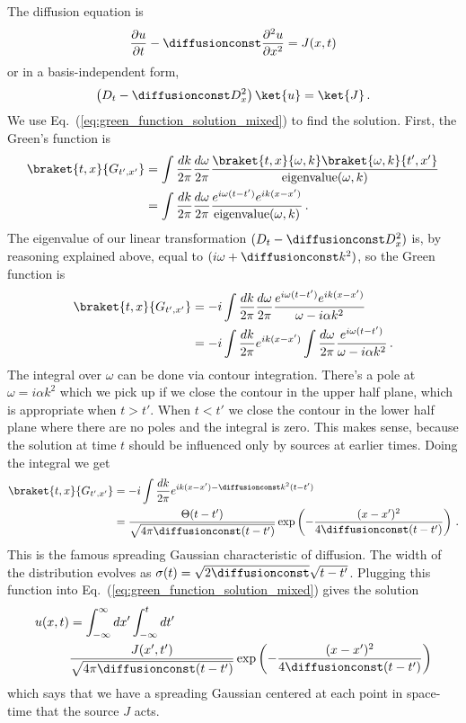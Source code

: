 
The diffusion equation is
\begin{equation}
  \frac{\partial u}{\partial t} - \diffusionconst \frac{\partial^2 u}{\partial x^2} = J(x, t)
\end{equation}
or in a basis-independent form,
\begin{equation}
  \left( D_t - \diffusionconst D_x^2 \right) \ket{u} = \ket{J}
  \, .
\end{equation}
We use Eq.~(\ref{eq:green_function_solution_mixed}) to find the solution.
First, the Green's function is
\begin{align}
  \braket{t, x}{G_{t', x'}}
  &= \int \frac{dk}{2\pi}\frac{d\omega}{2\pi} \frac{\braket{t, x}{\omega, k} \braket{\omega, k}{t', x'}}{\text{eigenvalue}(\omega, k)} \nonumber \\
  &= \int \frac{dk}{2\pi}\frac{d\omega}{2\pi} \frac{e^{i\omega (t-t')} e^{i k(x - x')}}{\text{eigenvalue}(\omega, k)}
  \, .
\end{align}
The eigenvalue of our linear transformation $(D_t - \diffusionconst D_x^2)$ is, by reasoning explained above, equal to $(i \omega + \diffusionconst k^2)$, so the Green function is
\begin{align}
  \braket{t, x}{G_{t', x'}}
  &= -i \int \frac{dk}{2\pi}\frac{d\omega}{2\pi} \frac{e^{i\omega (t-t')} e^{i k(x - x')}}{\omega - i \alpha k^2} \nonumber \\
  &= -i \int \frac{dk}{2\pi} e^{i k(x - x')}
  \int \frac{d\omega}{2\pi} \frac{e^{i\omega (t - t')}}{\omega - i \alpha k^2} \nonumber
  \, .
\end{align}
The integral over $\omega$ can be done via contour integration.
There's a pole at $\omega = i \alpha k^2$ which we pick up if we close the contour in the upper half plane, which is appropriate when $t > t'$.
When $t < t'$ we close the contour in the lower half plane where there are no poles and the integral is zero.
This makes sense, because the solution at time $t$ should be influenced only by sources at earlier times.
Doing the integral we get
\begin{align}
  \braket{t, x}{G_{t', x'}}
  &= -i \int \frac{dk}{2\pi} e^{i k(x - x') - \diffusionconst k^2 (t - t')} \nonumber \\
  &= \frac{\Theta(t-t')}{\sqrt{4 \pi \diffusionconst (t - t')}} \exp \left(
    - \frac{(x - x')^2}{4 \diffusionconst (t - t')}
  \right)
  \, . \nonumber
\end{align}
This is the famous spreading Gaussian characteristic of diffusion.
The width of the distribution evolves as $\sigma(t) = \sqrt{2 \diffusionconst} \sqrt{t - t'}$.
Plugging this function into Eq.~(\ref{eq:green_function_solution_mixed}) gives the solution
\begin{align}
  u(x, t)
  & = \int_{-\infty}^\infty dx' \int_{-\infty}^t dt' \nonumber \\
  &\frac{J(x', t')}{\sqrt{4 \pi \diffusionconst (t - t')}} \exp
    \left( - \frac{(x - x')^2}{4 \diffusionconst (t - t')} \right)
\end{align}
which says that we have a spreading Gaussian centered at each point in space-time that the source $J$ acts.
